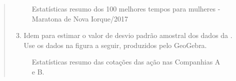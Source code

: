 \begin{quote}
\begin{enumerate}
\end{enumerate}

\begin{figure}[H]
\centering
\capstart

\noindent{}
\caption{Estatísticas resumo dos 100 melhores tempos para mulheres - Maratona de Nova Iorque/2017}\label{\detokenize{PE104-5:fig-summarymaratonamulheres}}\label{\detokenize{PE104-5:id3}}\end{figure}
\begin{enumerate}
\setcounter{enumi}{2}
\item {} 
Idem para estimar o valor de desvio padrão amostral dos dados da . Use os dados na figura a seguir, produzidos pelo GeoGebra.

\end{enumerate}

\begin{figure}[H]
\centering
\capstart

\noindent{}
\caption{Estatísticas resumo das cotações das ação nas Companhias A e B.}\label{\detokenize{PE104-5:fig-estrategia}}\label{\detokenize{PE104-5:id4}}\end{figure}
\end{quote}

